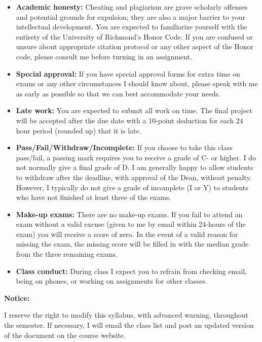 \documentclass[12pt]{article}
\begin{document}
\begin{itemize}\setlength\itemsep{0em}
\item \textbf{Academic honesty:} Cheating and plagiarism are grave scholarly
offenses and potential grounds
for expulsion; they are also a major barrier to your intellectual development.
You are expected to familiarize yourself with the entirety of the
University of Richmond’s Honor Code. If you are confused or unsure about
appropriate citation protocol or any other aspect of the Honor code,
please consult me before turning in an assignment.
\item \textbf{Special approval:} If you have special approval forms for extra
time on exams or any other circumstances I should know about, please speak
with me as early as possible so that we can best accommodate your needs.
\item \textbf{Late work:} You are expected to submit all work on time. The
final project will be accepted after the due date with a 10-point deduction
for each 24 hour period (rounded up) that it is late.
\item \textbf{Pass/Fail/Withdraw/Incomplete:} If you choose to take this
class pass/fail, a passing mark requires you to receive a grade of C- or
higher. I do not normally give a final grade of D. I am generally happy to
allow students to withdraw after the deadline, with approval of the Dean,
without penalty. However, I typically do not give a grade of incomplete (I or
Y) to students who have not finished at least three of the exams.
\item \textbf{Make-up exams:} There are no make-up exams. If you fail to
attend an exam without a valid excuse (given to me by email within 24-hours
of the exam) you will receive a score of zero. In the event of a valid reason
for missing the exam, the missing score will be filled in with the median
grade from the three remaining exams.
\item \textbf{Class conduct:} During class I expect you to refrain from checking
email, being on phones, or working on assignments for other classes.
\end{itemize}

\bigskip

\textbf{Notice:} \vspace{6pt}

I reserve the right to modify this syllabus, with advanced warning, throughout
the semester. If necessary, I will email the class list and post an updated
version of the document on the course website.
\end{document}
